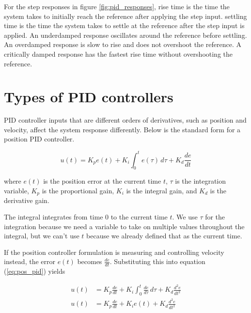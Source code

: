 For the \glspl{step response} in figure \ref{fig:pid_responses}, \gls{rise time}
is the time the \gls{system} takes to initially reach the \gls{reference} after
applying the \gls{step input}. \Gls{settling time} is the time the \gls{system}
takes to settle at the \gls{reference} after the \gls{step input} is applied. An
underdamped response oscillates around the \gls{reference} before settling. An
overdamped response is slow to rise and does not overshoot the \gls{reference}.
A critically damped response has the fastest rise time without overshooting the
\gls{reference}.

\section{Types of PID controllers}

PID controller inputs that are different orders of derivatives, such as position
and velocity, affect the \gls{system} response differently. Below is the
standard form for a position PID controller.

\begin{definition}
  \begin{equation}
    u(t) = K_p e(t) + K_i \int_0^t e(\tau) \,d\tau + K_d \frac{de}{dt}
    \label{eq:pos_pid}
  \end{equation}

  where $e(t)$ is the position error at the current time $t$, $\tau$ is the
  integration variable, $K_p$ is the proportional gain, $K_i$ is the integral
  gain, and $K_d$ is the derivative gain.
\end{definition}

The integral integrates from time $0$ to the current time $t$. We use $\tau$ for
the integration because we need a variable to take on multiple values throughout
the integral, but we can't use $t$ because we already defined that as the
current time.

If the position controller formulation is measuring and controlling velocity
instead, the error $e(t)$ becomes $\frac{de}{dt}$. Substituting this into
equation (\ref{eq:pos_pid}) yields

\begin{align}
  u(t) &= K_p \frac{de}{dt} + K_i \int_0^t \frac{de}{d\tau} \,d\tau +
    K_d \frac{d^2e}{dt^2} \nonumber \\
  u(t) &= K_p \frac{de}{dt} + K_i e(t) + K_d \frac{d^2e}{dt^2}
    \label{eq:u_de_dt}
\end{align}


